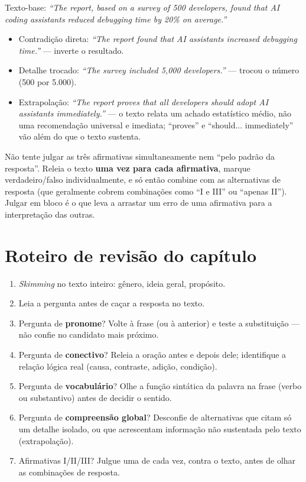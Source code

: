 \begin{exemplo}
Texto-base: \textit{“The report, based on a survey of 500 developers,
found that AI coding assistants reduced debugging time by 20\% on
average.”}

\begin{itemize}
\item Contradição direta: \textit{“The report found that AI assistants
increased debugging time.”} --- inverte o resultado.
\item Detalhe trocado: \textit{“The survey included 5,000 developers.”}
--- trocou o número (500 por 5.000).
\item Extrapolação: \textit{“The report proves that all developers should
adopt AI assistants immediately.”} --- o texto relata um achado estatístico
médio, não uma recomendação universal e imediata; “proves” e “should...
immediately” vão além do que o texto sustenta.
\end{itemize}
\end{exemplo}

\begin{regrapratica}
Não tente julgar as três afirmativas simultaneamente nem “pelo padrão da
resposta”. Releia o texto \textbf{uma vez para cada afirmativa}, marque
verdadeiro/falso individualmente, e só então combine com as alternativas
de resposta (que geralmente cobrem combinações como “I e III” ou “apenas
II”). Julgar em bloco é o que leva a arrastar um erro de uma afirmativa
para a interpretação das outras.
\end{regrapratica}

\section{Roteiro de revisão do capítulo}

\begin{regrapratica}
\begin{enumerate}
\item \textit{Skimming} no texto inteiro: gênero, ideia geral, propósito.
\item Leia a pergunta antes de caçar a resposta no texto.
\item Pergunta de \textbf{pronome}? Volte à frase (ou à anterior) e teste
a substituição --- não confie no candidato mais próximo.
\item Pergunta de \textbf{conectivo}? Releia a oração antes e depois dele;
identifique a relação lógica real (causa, contraste, adição, condição).
\item Pergunta de \textbf{vocabulário}? Olhe a função sintática da palavra
na frase (verbo ou substantivo) antes de decidir o sentido.
\item Pergunta de \textbf{compreensão global}? Desconfie de alternativas
que citam só um detalhe isolado, ou que acrescentam informação não
sustentada pelo texto (extrapolação).
\item Afirmativas I/II/III? Julgue uma de cada vez, contra o texto, antes
de olhar as combinações de resposta.
\end{enumerate}
\end{regrapratica}
